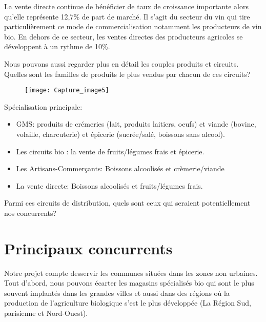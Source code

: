 \documentclass[12pt,a4paper]{report}
\begin{document}
La vente directe continue de bénéficier de taux de croissance importante alors qu'elle représente 12,7\% de part de marché. Il s'agit du secteur du vin qui tire particulièrement ce mode de commercialisation notamment les producteurs de vin bio. En dehors de ce secteur, les ventes directes des producteurs agricoles se développent à un rythme de 10\%.

Nous pouvons aussi regarder plus en détail les couples produits et circuits. Quelles sont les familles de produits le plus vendus par chacun de ces circuits?


\begin{figure}[h]
	\centering
	\texttt{[image: Capture\_image5]}
\end{figure}


Spécialisation principale:\\
\begin{itemize}
	\item GMS: produits de crémeries (lait, produits laitiers, oeufs) et viande (bovine, volaille, charcuterie) et épicerie (sucrée/salé, boissons sans alcool).
	
	\item Les circuits bio : la vente de fruits/légumes frais et épicerie.
	
	\item Les Artisans-Commerçants: Boissons alcoolisés et crèmerie/viande
	
	\item La vente directe: Boissons alcoolisés et fruits/légumes frais.
\end{itemize}



Parmi ces circuits de distribution, quels sont ceux qui seraient potentiellement nos concurrents?
		
			\section{Principaux concurrents}	
		
		Notre projet compte desservir les communes situées dans les zones non urbaines. \\
		 
		Tout d'abord, nous pouvons écarter les magasins spécialisés bio qui sont le plus souvent implantés dans les grandes villes et aussi dans des régions où la production de l’agriculture biologique s’est le plus développée (La Région Sud, parisienne et Nord-Ouest).  \\
		
\end{document}

